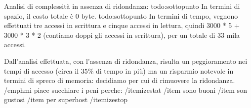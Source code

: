 Analisi di complessità in assenza di ridondanza:
{todo:sottopunto} In termini di spazio, il costo totale è 0 byte.
{todo:sottopunto} In termini di tempo, vegnono effettuati tre accessi in scrittura e cinque accessi in lettura, quindi 3000 * 5 + 3000 * 3 * 2 (contiamo doppi gli accessi in scrittura), per un totale di 33 mila accessi.

Dall'analisi effettuata, con l'assenza di ridondanza, risulta un peggioramento nei tempi di accesso (circa il 35\% di tempo in più) ma un risparmio notevole in termini di spreco di memoria: decidiamo per cui di rimuovere la ridondanza.
/emph{mi piace succhiare i peni perche:}
/itemize{stat}
/item sono buoni
/item son gustosi
/item per superhost
/itemize{stop}